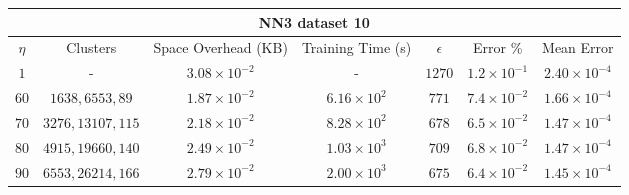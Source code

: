 \par\null\par
\par\null\par

\begin{adjustwidth}{-1.5cm}{}
\begin{tabular}{ccccccc}
\hline
\multicolumn{7}{c}{NN3 dataset 10} \\
\toprule
$\eta$ & Clusters & Space Overhead (KB) & Training Time (s) & $\epsilon$ & Error \% & Mean Error\\
\midrule
$1$  & - & $3.08 \times 10^{-2}$ & - & $1270$ & $1.2 \times 10^{-1}$ & $2.40 \times 10^{-4}$\\
$60$ & $1638, 6553, 89$ & $1.87 \times 10^{-2}$ & $6.16 \times 10^2$ & $771$ & $7.4 \times 10^{-2}$ & $1.66 \times 10^{-4}$\\
$70$ & $3276, 13107, 115$ & $2.18 \times 10^{-2}$ & $8.28 \times 10^2$ & $678$ & $6.5 \times 10^{-2}$ & $1.47 \times 10^{-4}$\\
$80$ & $4915, 19660, 140$ & $2.49 \times 10^{-2}$ & $1.03 \times 10^3$ & $709$ & $6.8 \times 10^{-2}$ & $1.47 \times 10^{-4}$\\
$90$ & $6553, 26214, 166$ & $2.79 \times 10^{-2}$ & $2.00 \times 10^3$ & $675$ & $6.4 \times 10^{-2}$ & $1.45 \times 10^{-4}$\\
\bottomrule
\end{tabular}
\end{adjustwidth}

\par\null\par
\par\null\par
